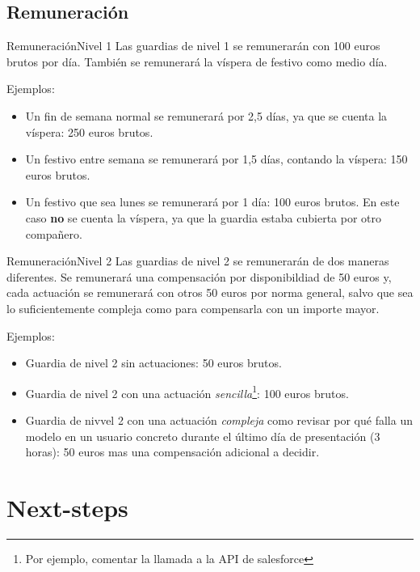 \documentclass[12pt, aspectratio=169]{beamer} %
\begin{document}
\subsection{Remuneración}

\begin{frame}{Remuneración}{Nivel 1}
  Las guardias de nivel 1 se remunerarán con 100 euros brutos por día.
  También se remunerará la víspera de festivo como medio día.

  Ejemplos:
  \begin{itemize}
  \item Un fin de semana normal se remunerará por 2,5 días, ya que se cuenta la víspera: 250 euros brutos.
  \item Un festivo entre semana se remunerará por 1,5 días, contando la víspera: 150 euros brutos.
  \item Un festivo que sea lunes se remunerará por 1 día: 100 euros brutos. En este caso \textbf{no} se cuenta la víspera, ya que la guardia estaba cubierta por otro compañero.
  \end{itemize}
\end{frame}

\begin{frame}{Remuneración}{Nivel 2}
  Las guardias de nivel 2 se remunerarán de dos maneras diferentes. Se remunerará una compensación por disponibildiad de 50 euros y, cada actuación se remunerará con otros 50 euros por norma general, salvo que sea lo suficientemente compleja como para compensarla con un importe mayor.

  Ejemplos:
  \begin{itemize}
  \item Guardia de nivel 2 sin actuaciones: 50 euros brutos. 
  \item Guardia de nivel 2 con una actuación \textit{sencilla}\footnote{Por ejemplo, comentar la llamada a la API de salesforce}: 100 euros brutos.
  \item Guardia de nivvel 2 con una actuación \textit{compleja} como revisar por qué falla un  modelo en un usuario concreto durante el último día de presentación (3 horas): 50 euros mas una compensación adicional a decidir.
  \end{itemize}

\end{frame}

\section{Next-steps}
\end{document}
